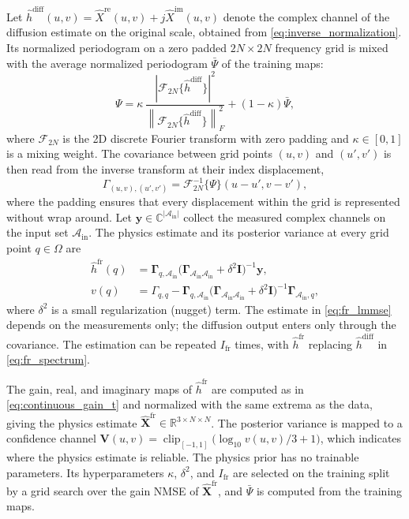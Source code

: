 \documentclass[lettersize,journal]{IEEEtran}
\newcommand{\vect}[1]{\boldsymbol{#1}}
\newcommand{\mat}[1]{\mathbf{#1}}
\newcommand{\R}{\mathbb{R}}
\newcommand{\norm}[1]{\left\lVert #1 \right\rVert}
\begin{document}
Let $\hat{h}^{\mathrm{diff}}(u,v)=\widehat{X}^{\mathrm{re}}(u,v)+j\widehat{X}^{\mathrm{im}}(u,v)$ denote the complex channel of the diffusion estimate on the original scale, obtained from \eqref{eq:inverse_normalization}. Its normalized periodogram on a zero padded $2N\times 2N$ frequency grid is mixed with the average normalized periodogram $\bar{\Psi}$ of the training maps:
\begin{equation}
	\Psi=\kappa\,\frac{|\mathcal{F}_{2N}\{\hat{h}^{\mathrm{diff}}\}|^{2}}{\norm{\mathcal{F}_{2N}\{\hat{h}^{\mathrm{diff}}\}}_{F}^{2}}+(1-\kappa)\bar{\Psi},
	\label{eq:fr_spectrum}
\end{equation}
where $\mathcal{F}_{2N}$ is the 2D discrete Fourier transform with zero padding and $\kappa\in[0,1]$ is a mixing weight. The covariance between grid points $(u,v)$ and $(u',v')$ is then read from the inverse transform at their index displacement,
\begin{equation}
	\Gamma_{(u,v),(u',v')}=\mathcal{F}^{-1}_{2N}\{\Psi\}(u-u',v-v'),
	\label{eq:fr_kernel}
\end{equation}
where the padding ensures that every displacement within the grid is represented without wrap around. Let $\vect{y}\in\mathbb{C}^{|\mathcal{A}_{\mathrm{in}}|}$ collect the measured complex channels on the input set $\mathcal{A}_{\mathrm{in}}$. The physics estimate and its posterior variance at every grid point $q\in\Omega$ are
\begin{align}
	\hat{h}^{\mathrm{fr}}(q)&=\mat{\Gamma}_{q,\mathcal{A}_{\mathrm{in}}}\big(\mat{\Gamma}_{\mathcal{A}_{\mathrm{in}}\mathcal{A}_{\mathrm{in}}}+\delta^{2}\mat{I}\big)^{-1}\vect{y},
	\label{eq:fr_lmmse}\\
	v(q)&=\Gamma_{q,q}-\mat{\Gamma}_{q,\mathcal{A}_{\mathrm{in}}}\big(\mat{\Gamma}_{\mathcal{A}_{\mathrm{in}}\mathcal{A}_{\mathrm{in}}}+\delta^{2}\mat{I}\big)^{-1}\mat{\Gamma}_{\mathcal{A}_{\mathrm{in}},q},
	\label{eq:fr_variance}
\end{align}
where $\delta^{2}$ is a small regularization (nugget) term. The estimate in \eqref{eq:fr_lmmse} depends on the measurements only; the diffusion output enters only through the covariance. The estimation can be repeated $I_{\mathrm{fr}}$ times, with $\hat{h}^{\mathrm{fr}}$ replacing $\hat{h}^{\mathrm{diff}}$ in \eqref{eq:fr_spectrum}.

The gain, real, and imaginary maps of $\hat{h}^{\mathrm{fr}}$ are computed as in \eqref{eq:continuous_gain_t} and normalized with the same extrema as the data, giving the physics estimate $\widehat{\mat{X}}^{\mathrm{fr}}\in\R^{3\times N\times N}$. The posterior variance is mapped to a confidence channel $\mat{V}(u,v)=\operatorname{clip}_{[-1,1]}\big(\log_{10}v(u,v)/3+1\big)$, which indicates where the physics estimate is reliable. The physics prior has no trainable parameters. Its hyperparameters $\kappa$, $\delta^{2}$, and $I_{\mathrm{fr}}$ are selected on the training split by a grid search over the gain NMSE of $\widehat{\mat{X}}^{\mathrm{fr}}$, and $\bar{\Psi}$ is computed from the training maps.
\end{document}
